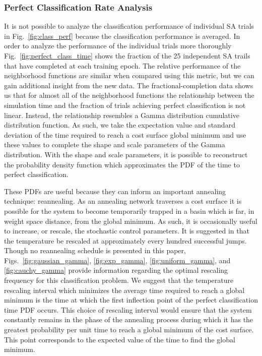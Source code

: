 \documentclass[11pt]{afthesis}
\begin{document}
	
	\subsubsection{Perfect Classification Rate Analysis}
	
	It is not possible to analyze the classification performance of individual SA trials in Fig.~\ref{fig:class_perf} because the classification performance is averaged. In order to analyze the performance of the individual trials more thoroughly Fig.~\ref{fig:perfect_class_time} shows the fraction of the 25 independent SA trails that have completed at each training epoch. The relative performance of the neighborhood functions are similar when compared using this metric, but we can gain additional insight from the new data. The fractional-completion data shows us that for almost all of the neighborhood functions the relationship between the simulation time and the fraction of trials achieving perfect classification is not linear. Instead, the relationship resembles a Gamma distribution cumulative distribution function. As such, we take the expectation value and standard deviation of the time required to reach a cost surface global minimum and use these values to complete the shape and scale parameters of the Gamma distribution. With the shape and scale parameters, it is possible to reconstruct the probability density function which approximates the PDF of the time to perfect classification.
	
	
	These PDFs are useful because they can inform an important annealing technique: reannealing. As an annealing network traverses a cost surface it is possible for the system to become temporarily trapped in a basin which is far, in weight space distance, from the global minimum. As such, it is occasionally useful to increase, or rescale, the stochastic control parameters. It is suggested in \cite{ingber1989veryfastsimulatedreannealing} that the temperature be rescaled at approximately every hundred successful jumps. Though no reannealing schedule is presented in this paper, Figs.~\ref{fig:gaussian_gamma}, \ref{fig:exp_gamma}, \ref{fig:uniform_gamma}, and \ref{fig:cauchy_gamma} provide information regarding the optimal rescaling frequency for this classification problem. We suggest that the temperature rescaling interval which minimizes the average time required to reach a global minimum is the time at which the first inflection point of the perfect classification time PDF occurs. This choice of rescaling interval would ensure that the system constantly remains in the phase of the annealing process during which it has the greatest probability per unit time to reach a global minimum of the cost surface. This point corresponds to the expected value of the time to find the global minimum.
	
\end{document}
